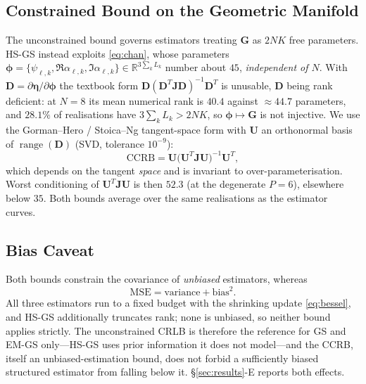 \documentclass[conference]{IEEEtran}
\DeclareMathOperator{\range}{range}
\newcommand{\bG}{\mathbf{G}}
\newcommand{\bU}{\mathbf{U}}
\newcommand{\bJ}{\mathbf{J}}
\newcommand{\bD}{\mathbf{D}}
\begin{document}
\subsection{Constrained Bound on the Geometric Manifold}
The unconstrained bound governs estimators treating $\bG$ as $2NK$ free
parameters. HS-GS instead exploits \eqref{eq:chan}, whose parameters $\boldsymbol{\phi}=\{\psi_{\ell,k},\Re\alpha_{\ell,k},\Im\alpha_{\ell,k}\}\in\mathbb{R}
^{3\sum_k L_k}$ number about $45$, \emph{independent of $N$}. With
$\bD=\partial\boldsymbol{\eta}/\partial\boldsymbol{\phi}$ the textbook form
$\bD(\bD^{T}\bJ\bD)^{-1}\bD^{T}$ is unusable, $\bD$ being rank deficient: at
$N=8$ its mean numerical rank is $40.4$ against $\approx44.7$ parameters, and
$28.1\%$ of realisations have $3\sum_k L_k>2NK$, so
$\boldsymbol{\phi}\mapsto\bG$ is not injective. We use the Gorman--Hero /
Stoica--Ng tangent-space form \cite{gorman1990,stoica1998} with $\bU$ an
orthonormal basis of $\range(\bD)$ (SVD, tolerance $10^{-9}$):
\begin{equation}\label{eq:ccrb}
\mathrm{CCRB}=\bU\bigl(\bU^{T}\bJ\bU\bigr)^{-1}\bU^{T},
\end{equation}
which depends on the tangent \emph{space} and is invariant to
over-parameterisation. Worst conditioning of $\bU^{T}\bJ\bU$ is then $52.3$ (at
the degenerate $P=6$), elsewhere below $35$. Both bounds average over the same
realisations as the estimator curves.

\subsection{Bias Caveat}
Both bounds constrain the covariance of \emph{unbiased} estimators, whereas
\begin{equation}\label{eq:mse}
\mathrm{MSE}=\mathrm{variance}+\mathrm{bias}^2 .
\end{equation}
All three estimators run to a fixed budget with the shrinking update
\eqref{eq:bessel}, and HS-GS additionally truncates rank; none is unbiased, so
neither bound applies strictly. The unconstrained CRLB is therefore the
reference for GS and EM-GS only---HS-GS uses prior information it does not
model---and the CCRB, itself an unbiased-estimation bound, does not forbid a
sufficiently biased structured estimator from falling below it.
\S\ref{sec:results}-E reports both effects.

\end{document}
